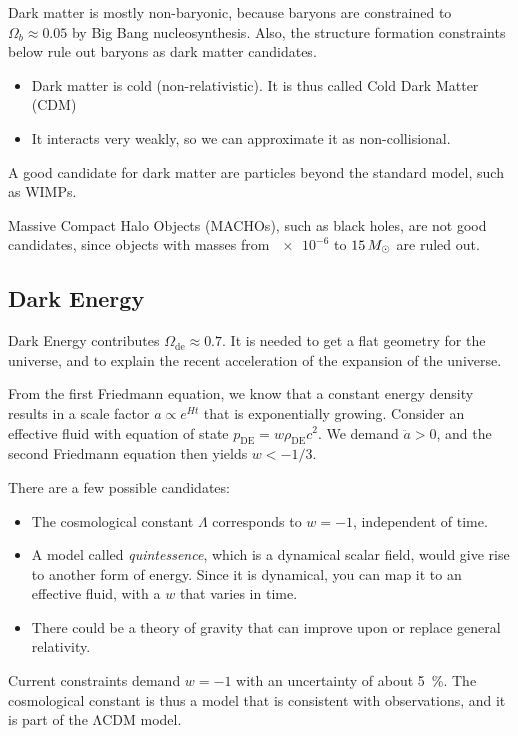 Dark matter is mostly non-baryonic, because baryons are constrained to $\Omega_b \approx 0.05$ by Big Bang nucleosynthesis. Also, the structure formation constraints below rule out baryons as dark matter candidates.
\begin{itemize}
	\item Dark matter is cold (non-relativistic). It is thus called Cold Dark Matter (CDM)
	\item It interacts very weakly, so we can approximate it as non-collisional.
\end{itemize}

A good candidate for dark matter are particles beyond the standard model, such as WIMPs.

Massive Compact Halo Objects (MACHOs), such as black holes, are not good candidates, since objects with masses from $\num{e-6}$ to $15\, M_\odot$ are ruled out.

\subsection*{Dark Energy}
Dark Energy contributes $\Omega_\text{de} \approx 0.7$. It is needed to get a flat geometry for the universe, and to explain the recent acceleration of the expansion of the universe.

From the first Friedmann equation, we know that a constant energy density results in a scale factor $a \propto e^{Ht}$ that is exponentially growing. Consider an effective fluid with equation of state $p_\text{DE} = w \rho_\text{DE} c^2$. We demand $\ddot{a} > 0$, and the second Friedmann equation then yields $w < -1/3$.

There are a few possible candidates:
\begin{itemize}
	\item The cosmological constant $\Lambda$ corresponds to $w=-1$, independent of time.
	\item A model called \emph{quintessence}, which is a dynamical scalar field, would give rise to another form of energy. Since it is dynamical, you can map it to an effective fluid, with a $w$ that varies in time.
	\item There could be a theory of gravity that can improve upon or replace general relativity.
\end{itemize}
Current constraints demand $w = -1$ with an uncertainty of about \SI{5}{\percent}. The cosmological constant is thus a model that is consistent with observations, and it is part of the ΛCDM model.

